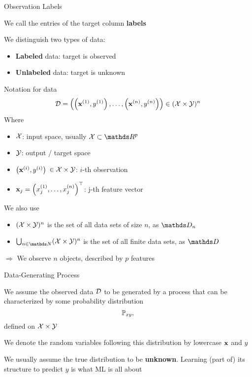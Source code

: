\documentclass[11pt,compress,t,notes=noshow, xcolor=table]{beamer}
\begin{document}
\begin{framei}{Observation Labels}
\item We call the entries of the target column \textbf{labels}
\item We distinguish two types of data:
\begin{itemize}
 \item \textbf{Labeled} data: target is observed
\item \textbf{Unlabeled} data:  target is unknown
\end{itemize}
\vfill
{} %
\end{framei}


\begin{frame2}{Notation for data}
$$
\mathcal{D} = \left( \left(\mathbf{x}^{(1)}, y^{(1)}\right), \ldots, \left(\mathbf{x}^{(n)}, y^{(n)}\right)\right) \in (\mathcal{X} \times \mathcal{Y})^n
$$
Where
\begin{itemize}
\item $\mathcal{X}$: input space, usually $\Xspace \subset \R^p$
\item $\mathcal{Y}$: output / target space
\item \(\left(\mathbf{x}^{(i)}, y^{(i)}\right)\) $\in \mathcal{X}\times \mathcal{Y}$:  \(i\)-th observation
\item $\mathbf{x}_j = \left(x^{(1)}_j, \ldots, x^{(n)}_j\right)^\top$: j-th feature vector
\end{itemize}
We also use
\begin{itemize}
\item  $(\mathcal{X} \times \mathcal{Y})^n$ is the set of all data sets of size $n$, as $\allDatasetsn$
\item $\defAllDatasets$ is the set of all finite data sets, as $\allDatasets$
\end{itemize}
\vfill
$\Rightarrow$ We observe $n$ objects, described by $p$ features
\end{frame2}


\begin{framei}[sep=L]{Data-Generating Process}
\item We assume the observed data $\mathcal{D}$ to be generated by a process that can be characterized by some probability distribution $$\mathbb{P}_{xy},$$ defined on $\mathcal{X} \times \mathcal{Y}$
\item We denote the random variables following this distribution by lowercase $\mathbf{x}$ and $y$
\item We usually assume the true distribution to be \textbf{unknown}.
Learning (part of) its structure to predict $y$ is what ML is all about
\end{framei}
\end{document}
